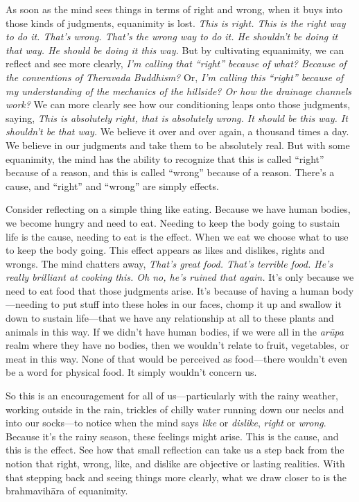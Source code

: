 As soon as the mind sees things in terms of right and wrong, when it 
buys into those kinds of judgments, equanimity is lost. \emph{This is 
right. This is the right way to do it. That's wrong. That's the wrong 
way to do it. He shouldn't be doing it that way. He should be doing it 
this way.} But by cultivating equanimity, we can reflect and see more 
clearly, \emph{I'm calling that ``right'' because of what? Because of 
the conventions of Theravada Buddhism?} Or, \emph{I'm calling this 
``right'' because of my understanding of the mechanics of the hillside? 
Or how the drainage channels work?} We can more clearly see how our 
conditioning leaps onto those judgments, saying, \emph{This is 
absolutely right, that is absolutely wrong. It should be this way. It 
shouldn't be that way.} We believe it over and over again, a thousand 
times a day. We believe in our judgments and take them to be absolutely 
real. But with some equanimity, the mind has the ability to recognize 
that this is called ``right'' because of a reason, and this is called 
``wrong'' because of a reason. There's a cause, and ``right'' and 
``wrong'' are simply effects.

Consider reflecting on a simple thing like eating. Because we have 
human bodies, we become hungry and need to eat. Needing to keep the 
body going to sustain life is the cause, needing to eat is the effect. 
When we eat we choose what to use to keep the body going. This effect 
appears as likes and dislikes, rights and wrongs. The mind chatters 
away, \emph{That's great food. That's terrible food. He's really 
brilliant at cooking this. Oh no, he's ruined that again.} It's only 
because we need to eat food that those judgments arise. It's because of 
having a human body---needing to put stuff into these holes in our 
faces, chomp it up and swallow it down to sustain life---that we have 
any relationship at all to these plants and animals in this way. If we 
didn't have human bodies, if we were all in the \emph{arūpa} realm 
where they have no bodies, then we wouldn't relate to fruit, 
vegetables, or meat in this way. None of that would be perceived as 
food---there wouldn't even be a word for physical food. It simply 
wouldn't concern us.

So this is an encouragement for all of us---particularly with the rainy 
weather, working outside in the rain, trickles of chilly water running 
down our necks and into our socks---to notice when the mind says 
\emph{like} or \emph{dislike}, \emph{right} or \emph{wrong}. Because 
it's the rainy season, these feelings might arise. This is the cause, 
and this is the effect. See how that small reflection can take us a 
step back from the notion that right, wrong, like, and dislike are 
objective or lasting realities. With that stepping back and seeing 
things more clearly, what we draw closer to is the brahmavihāra of 
equanimity.

